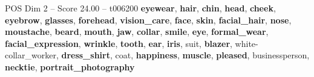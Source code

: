 \begin{textsample}{POS Dim 2 – Score 24.00 – t006200}  \label{ex:f2_pos_011}
\textbf{eyewear}, \textbf{hair}, \textbf{chin}, \textbf{head}, \textbf{cheek}, \textbf{eyebrow}, \textbf{glasses}, \textbf{forehead}, \textbf{vision\_care}, \textbf{face}, \textbf{skin}, \textbf{facial\_hair}, \textbf{nose}, \textbf{moustache}, \textbf{beard}, \textbf{mouth}, \textbf{jaw}, \textbf{collar}, \textbf{smile}, \textbf{eye}, \textbf{formal\_wear}, \textbf{facial\_expression}, \textbf{wrinkle}, \textbf{tooth}, \textbf{ear}, \textbf{iris}, suit, \textbf{blazer}, white-collar\_worker, \textbf{dress\_shirt}, coat, \textbf{happiness}, \textbf{muscle}, \textbf{pleased}, businessperson, \textbf{necktie}, \textbf{portrait\_photography}

\end{textsample}

